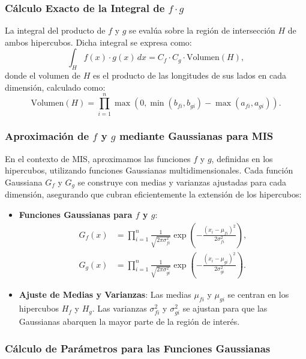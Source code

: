 \documentclass{article}
\begin{document}
\subsubsection{Cálculo Exacto de la Integral de \( f \cdot g \)}
La integral del producto de \( f \) y \( g \) se evalúa sobre la región de intersección \( H \) de ambos hipercubos. Dicha integral se expresa como:
\begin{equation*}
    \int_{H} f(x) \cdot g(x) \, dx = C_f \cdot C_g \cdot \text{Volumen}(H),
\end{equation*}
donde el volumen de \( H \) es el producto de las longitudes de sus lados en cada dimensión, calculado como:
\begin{equation*}
    \text{Volumen}(H) = \prod_{i=1}^{n} \max(0, \min(b_{fi}, b_{gi}) - \max(a_{fi}, a_{gi})).
\end{equation*}

\subsubsection{Aproximación de \( f \) y \( g \) mediante Gaussianas para MIS}
En el contexto de MIS, aproximamos las funciones \( f \) y \( g \), definidas en los hipercubos, utilizando funciones Gaussianas multidimensionales. Cada función Gaussiana \( G_f \) y \( G_g \) se construye con medias y varianzas ajustadas para cada dimensión, asegurando que cubran eficientemente la extensión de los hipercubos:

\begin{itemize}
    \item \textbf{Funciones Gaussianas para \( f \) y \( g \)}:
    \begin{align*}
        G_f(x) &= \prod_{i=1}^{n} \frac{1}{\sqrt{2\pi\sigma_{fi}^2}} \exp\left(-\frac{(x_i - \mu_{fi})^2}{2\sigma_{fi}^2}\right), \\
        G_g(x) &= \prod_{i=1}^{n} \frac{1}{\sqrt{2\pi\sigma_{gi}^2}} \exp\left(-\frac{(x_i - \mu_{gi})^2}{2\sigma_{gi}^2}\right).
    \end{align*}
    \item \textbf{Ajuste de Medias y Varianzas}: Las medias \( \mu_{fi} \) y \( \mu_{gi} \) se centran en los hipercubos \( H_f \) y \( H_g \). Las varianzas \( \sigma_{fi}^2 \) y \( \sigma_{gi}^2 \) se ajustan para que las Gaussianas abarquen la mayor parte de la región de interés.
\end{itemize}

\subsubsection{Cálculo de Parámetros para las Funciones Gaussianas}
\end{document}
